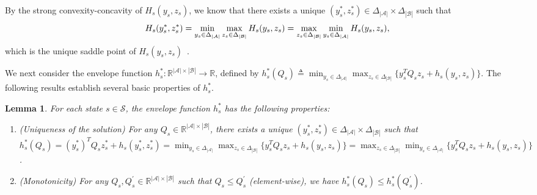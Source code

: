\documentclass{article}
\theoremstyle{plain}
\newtheorem{lemma}{Lemma}
\theoremstyle{definition}
\theoremstyle{remark}
\def\cA{\mathcal A}
\def\cB{\mathcal B}
\def\cS{\mathcal S}
\def\bydef{\triangleq}
\begin{document}
By the strong convexity-concavity of $H_s(y_s,z_s)$, we know that there exists a unique $(y_s^*,z_s^*) \in \Delta_{|\cA|} \times \Delta_{|\cB|}$ such that
\begin{align}
    H_s(y_s^*,z_s^*) = \min_{y_s \in \Delta_{|\cA|}} \max_{z_s \in \Delta_{|\cB|}}  H_s(y_s,z_s) = \max_{z_s \in \Delta_{|\cB|}} \min_{y_s \in \Delta_{|\cA|}}  H_s(y_s,z_s), \notag
\end{align}
which is the unique saddle point of $H_s(y_s,z_s)$~\cite{rockafellar1970convex,ekeland1999convex}.

We next consider the envelope function $h_s^*: \mathbb{R}^{|\cA| \times |\cB|} \to \mathbb{R}$, defined by $h^*_s(Q_s) \bydef \min_{y_s \in \Delta_{|\cA|}}\max_{z_s \in \Delta_{|\cB|}}  \{y_s^T Q_s z_s + h_s(y_s,z_s)\}$. The following results establish several basic properties of $h_s^*$.
\begin{lemma}
    \label{lemma: properties-of-h-star}
    For each state $s \in \cS$, the envelope function $h^*_s$ has the following properties:
    \begin{enumerate}[label=\roman*.]
        \item (Uniqueness of the solution) For any $Q_s \in \mathbb{R}^{|\cA| \times |\cB|}$, there exists a unique $(y_s^*,z_s^*) \in \Delta_{|\cA|} \times \Delta_{|\cB|}$ such that $h^*_s(Q_s) = (y_s^*)^T Q_s z_s^* + h_s(y_s^*,z_s^*) = \min_{y_s \in \Delta_{|\cA|}}\max_{z_s \in \Delta_{|\cB|}} \{y_s^T Q_s z_s + h_s(y_s,z_s)\} = \max_{z_s \in \Delta_{|\cB|}} \min_{y_s \in \Delta_{|\cA|}} \{y_s^T Q_s z_s + h_s(y_s,z_s)\}$.
        \item (Monotonicity) For any $Q_s, Q_s^\prime \in \mathbb{R}^{|\cA| \times |\cB|}$ such that $Q_s \le Q_s^\prime$ (element-wise), we have $h^*_s(Q_s) \le h^*_s(Q_s^\prime)$.
    \end{enumerate}
\end{lemma}
\end{document}
